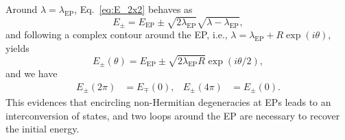 \documentclass[11pt,a4paper]{article}
\begin{document}
Around $\lambda = \lambda_\text{EP}$, Eq.~\eqref{eq:E_2x2} behaves as \cite{MoiseyevBook}
\begin{equation} \label{eq:E_EP}
        E_{\pm} = E_\text{EP} \pm \sqrt{2\lambda_\text{EP}} \sqrt{\lambda - \lambda_\text{EP}},
\end{equation}
and following a complex contour around the EP, i.e., $\lambda = \lambda_\text{EP} + R \exp(i\theta)$, yields
\begin{equation}
        E_{\pm}(\theta) = E_\text{EP} \pm \sqrt{2\lambda_\text{EP} R}  \exp(i\theta/2),
\end{equation}
and we have
\begin{align}
	E_{\pm}(2\pi) & = E_{\mp}(0),
	&
	E_{\pm}(4\pi) & = E_{\pm}(0).
\end{align}
This evidences that encircling non-Hermitian degeneracies at EPs leads to an interconversion of states, and two loops around the EP are necessary to recover the initial energy.
\end{document}
